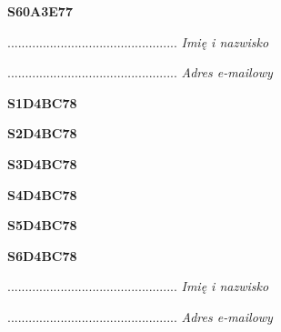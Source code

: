 \begin{turn}{90}\huge \textbf{S60A3E77}\end{turn}

\begin{turn}{90}\begin{minipage}{\linewidth} \vspace{20mm} ................................................  \textit{Imię i nazwisko}\end{minipage}\end{turn}

\begin{turn}{90}\begin{minipage}{\linewidth} \vspace{20mm} ................................................  \textit{Adres e-mailowy}\end{minipage}\end{turn}

\begin{turn}{90}\huge \textbf{S1D4BC78}\end{turn}

\begin{turn}{90}\huge \textbf{S2D4BC78}\end{turn}

\begin{turn}{90}\huge \textbf{S3D4BC78}\end{turn}

\begin{turn}{90}\huge \textbf{S4D4BC78}\end{turn}

\begin{turn}{90}\huge \textbf{S5D4BC78}\end{turn}

\begin{turn}{90}\huge \textbf{S6D4BC78}\end{turn}

\begin{turn}{90}\begin{minipage}{\linewidth} \vspace{20mm} ................................................  \textit{Imię i nazwisko}\end{minipage}\end{turn}

\begin{turn}{90}\begin{minipage}{\linewidth} \vspace{20mm} ................................................  \textit{Adres e-mailowy}\end{minipage}\end{turn}

